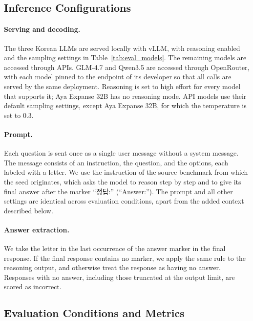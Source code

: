 

\subsection{Inference Configurations}

\paragraph{Serving and decoding.}
The three Korean LLMs are served locally with vLLM, with reasoning enabled and the sampling settings in Table~\ref{tab:eval_models}.
The remaining models are accessed through APIs.
GLM-4.7 and Qwen3.5 are accessed through OpenRouter, with each model pinned to the endpoint of its developer so that all calls are served by the same deployment.
Reasoning is set to high effort for every model that supports it; Aya Expanse 32B has no reasoning mode.
API models use their default sampling settings, except Aya Expanse 32B, for which the temperature is set to 0.3.

\paragraph{Prompt.}
Each question is sent once as a single user message without a system message.
The message consists of an instruction, the question, and the options, each labeled with a letter.
We use the instruction of the source benchmark from which the seed originates, which asks the model to reason step by step and to give its final answer after the marker ``정답:'' (``Answer:'').
The prompt and all other settings are identical across evaluation conditions, apart from the added context described below.

\paragraph{Answer extraction.}
We take the letter in the last occurrence of the answer marker in the final response.
If the final response contains no marker, we apply the same rule to the reasoning output, and otherwise treat the response as having no answer.
Responses with no answer, including those truncated at the output limit, are scored as incorrect.

\subsection{Evaluation Conditions and Metrics}

